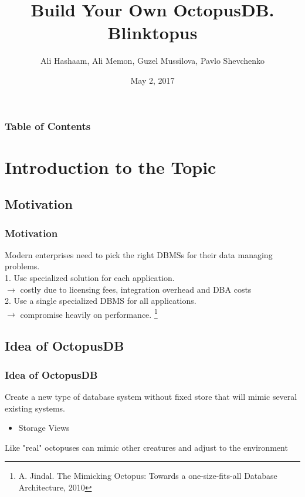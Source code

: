 \documentclass{beamer}
\title{Build Your Own OctopusDB.\\ Blinktopus}
\author{Ali Hashaam, Ali Memon, Guzel Mussilova, Pavlo Shevchenko}
\date{May 2, 2017}
\institute{Scientific Project: Databases for Multi-Dimensional Data, Genomics and Modern Hardware}
\begin{document}
\begin{frame}[plain]
 \titlepage
\end{frame}

\begin{frame}
\frametitle{Table of Contents}
\tableofcontents
\end{frame}

\section{Introduction to the Topic}

\subsection{Motivation}
\begin{frame}
\frametitle{Motivation}
Modern enterprises need to pick the right DBMSs for their data managing problems.\\ \pause
\hspace{0.2 cm} 1. Use specialized solution for each application. \\ \pause
\hspace{0.5 cm} $\rightarrow$ costly due to licensing fees, integration overhead and DBA costs\\ \pause
\hspace{0.2 cm} 2. Use a single specialized DBMS for all applications. \\ \pause
\hspace{0.5 cm} $\rightarrow$ compromise heavily on performance.
\footnote{A. Jindal. The Mimicking Octopus: Towards a one-size-fits-all Database Architecture, 2010}
\end{frame}

\subsection{Idea of OctopusDB}
\begin{frame}
\frametitle{Idea of OctopusDB}
Create a new type of database system without fixed store that will mimic several existing systems. \\ \pause
\begin{itemize}
\item{Storage Views}
\end{itemize}
Like "real" octopuses can mimic other creatures and adjust to the environment
\end{frame}
\end{document}
